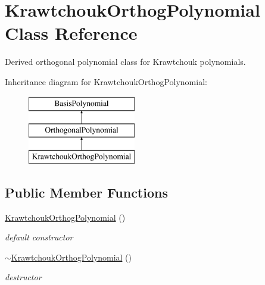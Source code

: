 \section{Krawtchouk\+Orthog\+Polynomial Class Reference}
\label{classPecos_1_1KrawtchoukOrthogPolynomial}


Derived orthogonal polynomial class for Krawtchouk polynomials.  


Inheritance diagram for Krawtchouk\+Orthog\+Polynomial\+:\begin{figure}[H]
\begin{center}
\leavevmode
\includegraphics[height=3.000000cm]{classPecos_1_1KrawtchoukOrthogPolynomial}
\end{center}
\end{figure}
\subsection*{Public Member Functions}
\begin{DoxyCompactItemize}
\item 
\hyperlink{classPecos_1_1KrawtchoukOrthogPolynomial_a0bc810e2d27ecfffcbb0f7715c09a772}{Krawtchouk\+Orthog\+Polynomial} ()\label{classPecos_1_1KrawtchoukOrthogPolynomial_a0bc810e2d27ecfffcbb0f7715c09a772}

\begin{DoxyCompactList}\small\item\em default constructor \end{DoxyCompactList}\item 
\hyperlink{classPecos_1_1KrawtchoukOrthogPolynomial_a367830b19e0c13779300ca95a94cbf1f}{$\sim$\+Krawtchouk\+Orthog\+Polynomial} ()\label{classPecos_1_1KrawtchoukOrthogPolynomial_a367830b19e0c13779300ca95a94cbf1f}

\begin{DoxyCompactList}\small\item\em destructor \end{DoxyCompactList}\end{DoxyCompactItemize}
